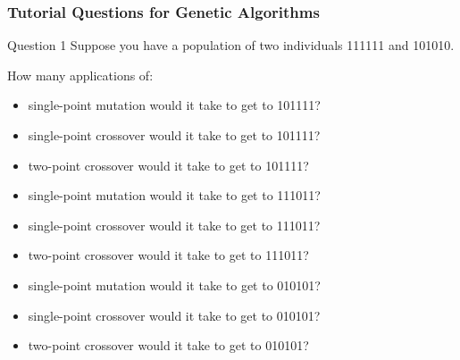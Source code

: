 \documentclass[aspectratio=169, 10pt]{beamer}
\begin{document}
\begin{frame}
    \frametitle{Tutorial Questions for Genetic Algorithms}

    \begin{block}{Question 1}
        Suppose you have a population of two individuals 111111 and 101010.    
    \end{block}

    How many applications of:
    \begin{itemize}
        \item single-point mutation would it take to get to 101111? 
        \item single-point crossover would it take to get to  101111? 
        \item two-point crossover would it take to get to  101111? 
        \item single-point mutation would it take to get to  111011? 
        \item single-point crossover would it take to get to  111011? 
        \item two-point crossover would it take to get to  111011? 
        \item single-point mutation would it take to get to  010101? 
        \item single-point crossover would it take to get to  010101? 
        \item two-point crossover would it take to get to  010101? 
    \end{itemize}
\end{frame}
\end{document}
